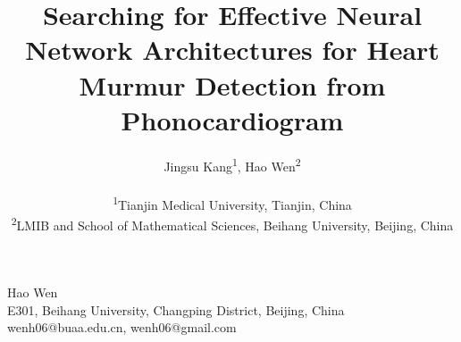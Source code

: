 \documentclass[twocolumn]{cinc}
\title{Searching for Effective Neural Network Architectures for Heart Murmur Detection from Phonocardiogram}
\author{Jingsu Kang\textsuperscript{1},
Hao Wen\textsuperscript{2} \\ \ \\
\textsuperscript{1}Tianjin Medical University, Tianjin, China\\
\textsuperscript{2}LMIB and School of Mathematical Sciences, Beihang University, Beijing, China}
\begin{document}
\maketitle






















\begin{correspondence}
Hao Wen\\
E301, Beihang University, Changping District, Beijing, China\\
wenh06@buaa.edu.cn, wenh06@gmail.com
\end{correspondence}

\balance
\end{document}
